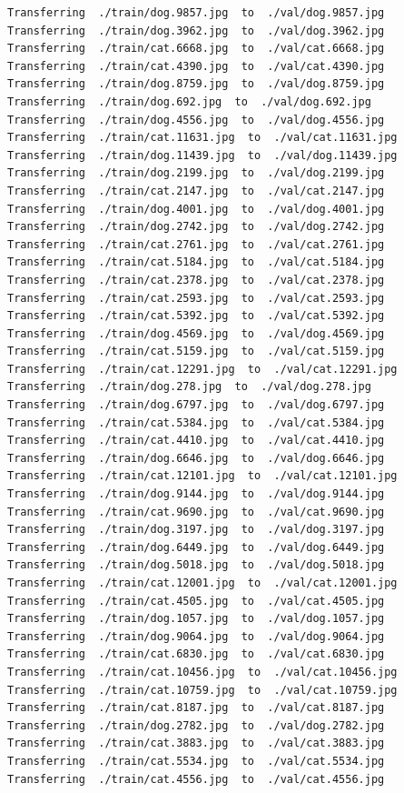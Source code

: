 \documentclass[]{book}
\theoremstyle{definition}
\theoremstyle{definition}
\theoremstyle{definition}
\theoremstyle{remark}
\begin{document}
\begin{verbatim}
Transferring  ./train/dog.9857.jpg  to  ./val/dog.9857.jpg
Transferring  ./train/dog.3962.jpg  to  ./val/dog.3962.jpg
Transferring  ./train/cat.6668.jpg  to  ./val/cat.6668.jpg
Transferring  ./train/cat.4390.jpg  to  ./val/cat.4390.jpg
Transferring  ./train/dog.8759.jpg  to  ./val/dog.8759.jpg
Transferring  ./train/dog.692.jpg  to  ./val/dog.692.jpg
Transferring  ./train/dog.4556.jpg  to  ./val/dog.4556.jpg
Transferring  ./train/cat.11631.jpg  to  ./val/cat.11631.jpg
Transferring  ./train/dog.11439.jpg  to  ./val/dog.11439.jpg
Transferring  ./train/dog.2199.jpg  to  ./val/dog.2199.jpg
Transferring  ./train/cat.2147.jpg  to  ./val/cat.2147.jpg
Transferring  ./train/dog.4001.jpg  to  ./val/dog.4001.jpg
Transferring  ./train/dog.2742.jpg  to  ./val/dog.2742.jpg
Transferring  ./train/cat.2761.jpg  to  ./val/cat.2761.jpg
Transferring  ./train/cat.5184.jpg  to  ./val/cat.5184.jpg
Transferring  ./train/cat.2378.jpg  to  ./val/cat.2378.jpg
Transferring  ./train/cat.2593.jpg  to  ./val/cat.2593.jpg
Transferring  ./train/cat.5392.jpg  to  ./val/cat.5392.jpg
Transferring  ./train/dog.4569.jpg  to  ./val/dog.4569.jpg
Transferring  ./train/cat.5159.jpg  to  ./val/cat.5159.jpg
Transferring  ./train/cat.12291.jpg  to  ./val/cat.12291.jpg
Transferring  ./train/dog.278.jpg  to  ./val/dog.278.jpg
Transferring  ./train/dog.6797.jpg  to  ./val/dog.6797.jpg
Transferring  ./train/cat.5384.jpg  to  ./val/cat.5384.jpg
Transferring  ./train/cat.4410.jpg  to  ./val/cat.4410.jpg
Transferring  ./train/dog.6646.jpg  to  ./val/dog.6646.jpg
Transferring  ./train/cat.12101.jpg  to  ./val/cat.12101.jpg
Transferring  ./train/dog.9144.jpg  to  ./val/dog.9144.jpg
Transferring  ./train/cat.9690.jpg  to  ./val/cat.9690.jpg
Transferring  ./train/dog.3197.jpg  to  ./val/dog.3197.jpg
Transferring  ./train/dog.6449.jpg  to  ./val/dog.6449.jpg
Transferring  ./train/dog.5018.jpg  to  ./val/dog.5018.jpg
Transferring  ./train/cat.12001.jpg  to  ./val/cat.12001.jpg
Transferring  ./train/cat.4505.jpg  to  ./val/cat.4505.jpg
Transferring  ./train/dog.1057.jpg  to  ./val/dog.1057.jpg
Transferring  ./train/dog.9064.jpg  to  ./val/dog.9064.jpg
Transferring  ./train/cat.6830.jpg  to  ./val/cat.6830.jpg
Transferring  ./train/cat.10456.jpg  to  ./val/cat.10456.jpg
Transferring  ./train/cat.10759.jpg  to  ./val/cat.10759.jpg
Transferring  ./train/cat.8187.jpg  to  ./val/cat.8187.jpg
Transferring  ./train/dog.2782.jpg  to  ./val/dog.2782.jpg
Transferring  ./train/cat.3883.jpg  to  ./val/cat.3883.jpg
Transferring  ./train/cat.5534.jpg  to  ./val/cat.5534.jpg
Transferring  ./train/cat.4556.jpg  to  ./val/cat.4556.jpg

\end{verbatim}
\end{document}
